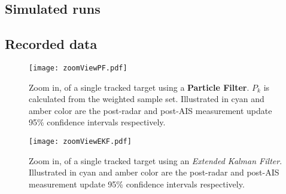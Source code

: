 \subsection{Simulated runs}




\subsection{Recorded data}
\begin{figure}
	\centering
	\texttt{[image: zoomViewPF.pdf]}
	\caption{Zoom in, of a single tracked target using a \textbf{Particle Filter}. $P_k$ is calculated from the weighted sample set. Illustrated in cyan and amber color are the post-radar and post-AIS measurement update 95\% confidence intervals respectively. }
	\label{fig:zoomviewpf}
\end{figure}


\begin{figure}
	\centering
	\texttt{[image: zoomViewEKF.pdf]}
	\caption{Zoom in, of a single tracked target using an \emph{Extended Kalman Filter}. Illustrated in cyan and amber color are the post-radar and post-AIS measurement update 95\% confidence intervals respectively. }
	\label{fig:zoomviewpf}
\end{figure}



